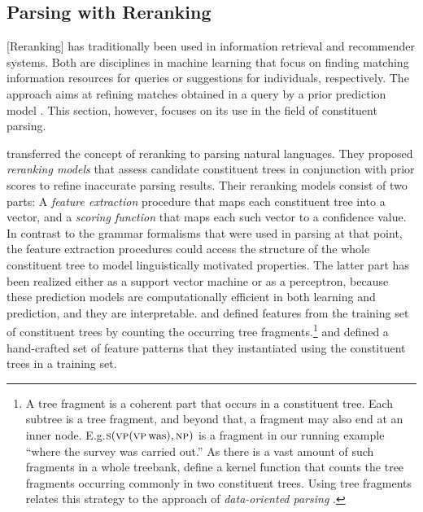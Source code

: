 \documentclass[../document.tex]{subfiles}
\begin{document}
    \subsection{Parsing with Reranking}\label{sec:references:reranking}
    [Reranking] has traditionally been used in information retrieval and recommender systems.
    Both are disciplines in machine learning that focus on finding matching information resources for queries or suggestions for individuals, respectively.
    The approach aims at refining matches obtained in a query by a prior prediction model \citep{carbonell1998use,adomavicius2009toward}.
    This section, however, focuses on its use in the field of constituent parsing.

     transferred the concept of reranking to parsing natural languages.
    They proposed \emph{reranking models} that assess candidate constituent trees in conjunction with prior scores to refine inaccurate parsing results.
    Their reranking models consist of two parts:
        A \emph{feature extraction} procedure that maps each constituent tree into a vector, and a \emph{scoring function} that maps each such vector to a confidence value.
    In contrast to the grammar formalisms that were used in parsing at that point, the feature extraction procedures could access the structure of the whole constituent tree to model linguistically motivated properties.
    The latter part has been realized either as a support vector machine or as a perceptron, because these prediction models are computationally efficient in both learning and prediction, and they are interpretable.
     and \citet{shen2003svm} defined features from the training set of constituent trees by counting the occurring tree fragments.\footnote{
        A tree fragment is a coherent part that occurs in a constituent tree.
        Each subtree is a tree fragment, and beyond that, a fragment may also end at an inner node.
        E.g.\@ \(\textsc{s} (\textsc{vp} (\textsc{vp}\, \text{was}), \textsc{np})\) is a fragment in our running example ``where the survey was carried out.''
        As there is a vast amount of such fragments in a whole treebank, \citet{collins2001convolution} define a kernel function that counts the tree fragments occurring commonly in two constituent trees.
        Using tree fragments relates this strategy to the approach of \emph{data-oriented parsing} \citep{Bod92}.
    }
     and \citet{charniak2005coarse} defined a hand-crafted set of feature patterns that they instantiated using the constituent trees in a training set.
\end{document}
